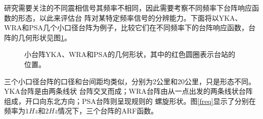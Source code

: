 研究需要关注的不同震相信号其频率不相同，因此需要考察不同频率下台阵响应函数的形态，以此来评估台
阵对某特定频率信号的分辨能力。下面将以YKA、WRA和PSA几个小口径台阵为例子，比较它们在不同频率下的台阵响应函数，台阵的几何形状见图\ref{geometery}。


\begin{figure}[tbph]
\hfill{}
\hfill{}
\hfill{}
\hfill{}
\caption{小台阵YKA、WRA和PSA的几何形状，其中的红色圆圈表示台站的位置。}
\label{geometery}
\end{figure}

三个小口径台阵的口径和台间距均类似，分别为2公里和20公里，只是形态不同。YKA台阵是由两条线状
台阵交叉而成；WRA台阵由从一点出发的两条线状台阵组成，开口向东北方向；PSA台阵则呈现规则的
螺旋形状。图\ref{freq}显示了分别在频率为$1Hz$和$2Hz$情况下，三个台阵的ARF函数。

